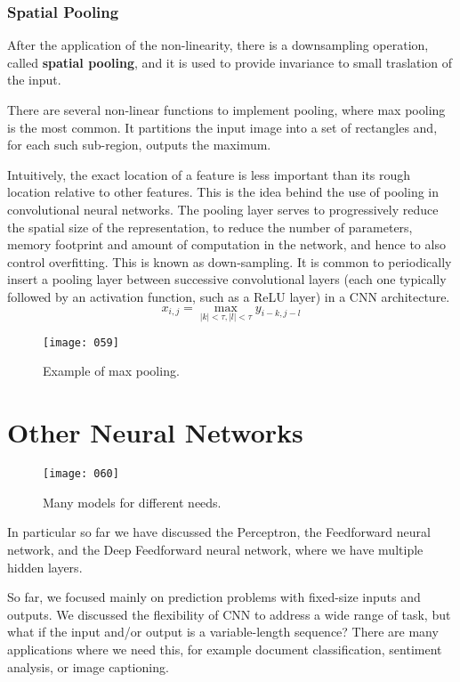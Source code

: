 \subsubsection{Spatial Pooling}
After the application of the non-linearity, there is a downsampling operation, called \textbf{spatial pooling}, and it is used to provide invariance to small traslation of the input.

There are several non-linear functions to implement pooling, where max pooling is the most common. It partitions the input image into a set of rectangles and, for each such sub-region, outputs the maximum. 

Intuitively, the exact location of a feature is less important than its rough location relative to other features. This is the idea behind the use of pooling in convolutional neural networks. The pooling layer serves to progressively reduce the spatial size of the representation, to reduce the number of parameters, memory footprint and amount of computation in the network, and hence to also control overfitting. This is known as down-sampling. It is common to periodically insert a pooling layer between successive convolutional layers (each one typically followed by an activation function, such as a ReLU layer) in a CNN architecture.
\begin{equation}
    x_{i,j} = \max_{|k| < \tau , |l| < \tau} y_{i-k,j-l}
\end{equation}

\begin{figure}[h!]
    \centering
    \texttt{[image: 059]}
    \caption{Example of max pooling.}
    \label{fig:059}
\end{figure}

\section{Other Neural Networks}
\begin{figure}[t!]
    \centering
    \texttt{[image: 060]}
    \caption{Many models for different needs.}
    \label{fig:060}
\end{figure}

In particular so far we have discussed the Perceptron, the Feedforward neural network, and the Deep Feedforward neural network, where we have multiple hidden layers.

So far, we focused mainly on prediction problems with fixed-size inputs and outputs. We discussed the flexibility of CNN to address a wide range of task, but what if the input and/or output is a variable-length sequence? There are many applications where we need this, for example document classification, sentiment analysis, or image captioning.

